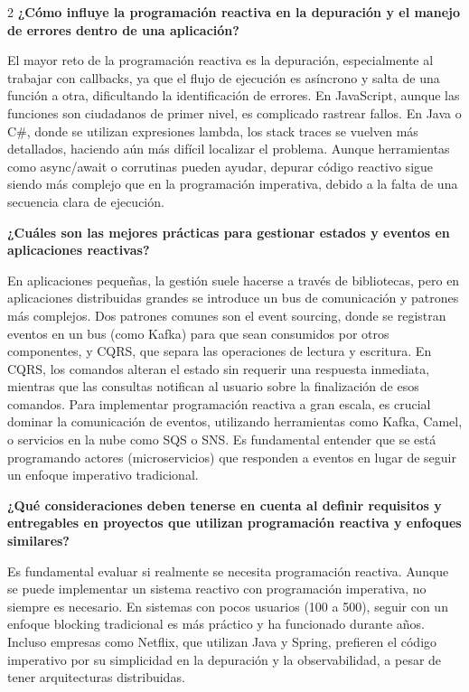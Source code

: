 \documentclass[12pt,spanish,Letterpaper,openany]{book}
\begin{document}
\begin {multicols}{2}
\textbf{¿Cómo influye la programación reactiva en la depuración y el manejo de errores dentro de una aplicación?}

El mayor reto de la programación reactiva es la depuración, especialmente al trabajar con callbacks, ya que el flujo de ejecución es asíncrono y salta de una función a otra, dificultando la identificación de errores. En JavaScript, aunque las funciones son ciudadanos de primer nivel, es complicado rastrear fallos. En Java o C\#, donde se utilizan expresiones lambda, los stack traces se vuelven más detallados, haciendo aún más difícil localizar el problema. Aunque herramientas como async/await o corrutinas pueden ayudar, depurar código reactivo sigue siendo más complejo que en la programación imperativa, debido a la falta de una secuencia clara de ejecución.

\textbf{¿Cuáles son las mejores prácticas para gestionar estados y eventos en aplicaciones reactivas?}

En aplicaciones pequeñas, la gestión suele hacerse a través de bibliotecas, pero en aplicaciones distribuidas grandes se introduce un bus de comunicación y patrones más complejos. Dos patrones comunes son el event sourcing, donde se registran eventos en un bus (como Kafka) para que sean consumidos por otros componentes, y CQRS, que separa las operaciones de lectura y escritura. En CQRS, los comandos alteran el estado sin requerir una respuesta inmediata, mientras que las consultas notifican al usuario sobre la finalización de esos comandos. Para implementar programación reactiva a gran escala, es crucial dominar la comunicación de eventos, utilizando herramientas como Kafka, Camel, o servicios en la nube como SQS o SNS. Es fundamental entender que se está programando actores (microservicios) que responden a eventos en lugar de seguir un enfoque imperativo tradicional.

\textbf{¿Qué consideraciones deben tenerse en cuenta al definir requisitos y entregables en proyectos que utilizan programación reactiva y enfoques similares?}

Es fundamental evaluar si realmente se necesita programación reactiva. Aunque se puede implementar un sistema reactivo con programación imperativa, no siempre es necesario. En sistemas con pocos usuarios (100 a 500), seguir con un enfoque blocking tradicional es más práctico y ha funcionado durante años. Incluso empresas como Netflix, que utilizan Java y Spring, prefieren el código imperativo por su simplicidad en la depuración y la observabilidad, a pesar de tener arquitecturas distribuidas.


\end{multicols}
\end{document}
